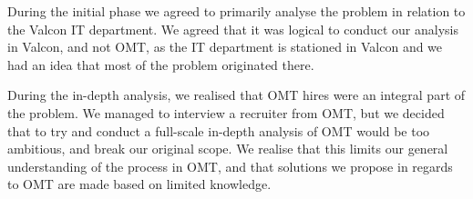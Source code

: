 During the initial phase we agreed to primarily analyse the problem in relation to the Valcon IT department. We agreed that it was logical to conduct our analysis in Valcon, and not OMT, as the IT department is stationed in Valcon and we had an idea that most of the problem originated there.

During the in-depth analysis, we realised that OMT hires were an integral part of the problem. We managed to interview a recruiter from OMT, but we decided that to try and conduct a full-scale in-depth analysis of OMT would be too ambitious, and break our original scope. 
We realise that this limits our general understanding of the process in OMT, and that solutions we propose in regards to OMT are made based on limited knowledge.